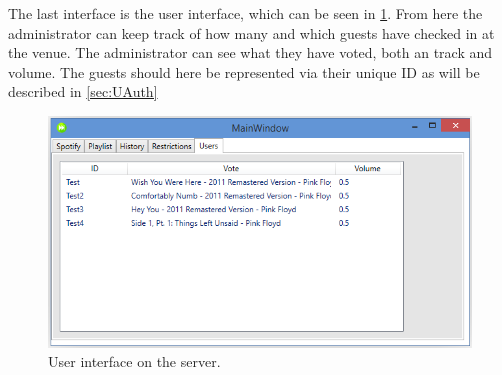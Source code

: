 The last interface is the user interface, which can be seen in \cref{fig:ServerInterfaceUsers}. From here the administrator can keep track of how many and which guests have checked in at the venue. The administrator can see what they have voted, both an track and volume. The guests should here be represented via their unique ID as will be described in \cref{sec:UAuth}
\begin{figure}[hbtp]
  \centering
  \includegraphics[width=\textwidth]{Images/ServerInterfaceUsers.png}
  \caption{User interface on the server.}\label{fig:ServerInterfaceUsers}
\end{figure}
